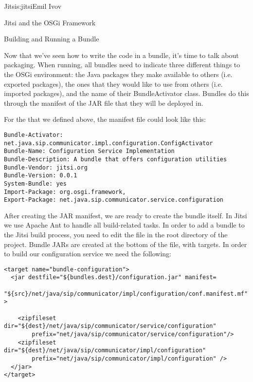 \begin{aosachapter}{Jitsi}{s:jitsi}{Emil Ivov}
\begin{aosasect1}{Jitsi and the OSGi Framework}

\end{aosasect1}

\begin{aosasect1}{Building and Running a Bundle}

Now that we've seen how to write the code in a bundle, it's time to
talk about packaging. When running, all bundles need to indicate three
different things to the OSGi environment: the Java packages they make
available to others (i.e. exported packages), the ones that they would
like to use from others (i.e. imported packages), and the name of
their BundleActivator class. Bundles do this through the manifest of
the JAR file that they will be deployed in.

For the  that we defined above, the
manifest file could look like this:

\begin{verbatim}
Bundle-Activator: net.java.sip.communicator.impl.configuration.ConfigActivator
Bundle-Name: Configuration Service Implementation
Bundle-Description: A bundle that offers configuration utilities
Bundle-Vendor: jitsi.org
Bundle-Version: 0.0.1
System-Bundle: yes
Import-Package: org.osgi.framework,
Export-Package: net.java.sip.communicator.service.configuration
\end{verbatim}

After creating the JAR manifest, we are ready to create the bundle
itself. In Jitsi we use Apache Ant to handle all build-related
tasks. In order to add a bundle to the Jitsi build process, you need
to edit the  file in the root directory of the
project.  Bundle JARs are created at the bottom of the
 file, with  targets. In order to
build our configuration service we need the following:

\begin{verbatim}
<target name="bundle-configuration">
  <jar destfile="${bundles.dest}/configuration.jar" manifest=
    "${src}/net/java/sip/communicator/impl/configuration/conf.manifest.mf" >

    <zipfileset dir="${dest}/net/java/sip/communicator/service/configuration"
        prefix="net/java/sip/communicator/service/configuration"/>
    <zipfileset dir="${dest}/net/java/sip/communicator/impl/configuration"
        prefix="net/java/sip/communicator/impl/configuration" />
  </jar>
</target>
\end{verbatim}


\end{aosasect1}
\end{aosachapter}
